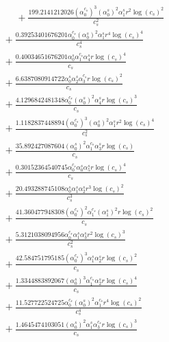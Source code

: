 \documentclass[10pt]{article}
\begin{document}
\begin{align*}
\phantom{R_{3,9}} &\phantom{={}}{}  + \frac{199.2141212026 \left(\alpha_{0}^{c_s}\right)^{3} \left(\alpha_{0}^s\right)^{2} \alpha_{1}^s r^{2} \log{\left(c_{s} \right)}^{2}}{c_{s}^{2}} \\
&{}  + \frac{0.39253401676201 \alpha_{0}^{c_s} \left(\alpha_{0}^s\right)^{2} \alpha_{1}^s r^{4} \log{\left(c_{s} \right)}^{4}}{c_{s}^{4}} \\
&{}  + \frac{0.40034651676201 \alpha_{0}^s \alpha_{1}^{c_s} \alpha_{4}^s r \log{\left(c_{s} \right)}^{4}}{c_{s}} \\
&{}  + \frac{6.6387080914722 \alpha_{0}^s \alpha_{2}^s \alpha_{3}^{c_s} r \log{\left(c_{s} \right)}^{2}}{c_{s}} \\
&{}  + \frac{4.1296842481348 \alpha_{0}^{c_s} \left(\alpha_{0}^s\right)^{2} \alpha_{4}^s r \log{\left(c_{s} \right)}^{3}}{c_{s}} \\
&{}  + \frac{1.1182837448894 \left(\alpha_{0}^{c_s}\right)^{3} \left(\alpha_{0}^s\right)^{2} \alpha_{1}^s r^{2} \log{\left(c_{s} \right)}^{4}}{c_{s}^{2}} \\
&{}  + \frac{35.892427087604 \left(\alpha_{0}^s\right)^{2} \alpha_{1}^{c_s} \alpha_{3}^s r \log{\left(c_{s} \right)}}{c_{s}} \\
&{}  + \frac{0.30152364540745 \alpha_{0}^{c_s} \alpha_{0}^s \alpha_{5}^s r \log{\left(c_{s} \right)}^{4}}{c_{s}} \\
&{}  + \frac{20.493288745108 \alpha_{0}^s \alpha_{1}^s \alpha_{2}^s r^{3} \log{\left(c_{s} \right)}^{2}}{c_{s}^{3}} \\
&{}  + \frac{41.360477948308 \left(\alpha_{0}^{c_s}\right)^{2} \alpha_{1}^{c_s} \left(\alpha_{1}^s\right)^{2} r \log{\left(c_{s} \right)}^{2}}{c_{s}} \\
&{}  + \frac{5.3121038094956 \alpha_{0}^{c_s} \alpha_{1}^s \alpha_{3}^s r^{2} \log{\left(c_{s} \right)}^{3}}{c_{s}^{2}} \\
&{}  + \frac{42.584751795185 \left(\alpha_{0}^{c_s}\right)^{3} \alpha_{1}^s \alpha_{2}^s r \log{\left(c_{s} \right)}^{2}}{c_{s}} \\
&{}  + \frac{1.3344883892067 \left(\alpha_{0}^s\right)^{3} \alpha_{1}^{c_s} \alpha_{2}^s r \log{\left(c_{s} \right)}^{4}}{c_{s}} \\
&{}  + \frac{11.527722524725 \alpha_{0}^{c_s} \left(\alpha_{0}^s\right)^{2} \alpha_{1}^{c_s} r^{4} \log{\left(c_{s} \right)}^{2}}{c_{s}^{4}} \\
&{}  + \frac{1.4645474103051 \left(\alpha_{0}^s\right)^{2} \alpha_{1}^s \alpha_{3}^{c_s} r \log{\left(c_{s} \right)}^{3}}{c_{s}} \\

\end{align*}
\end{document}

